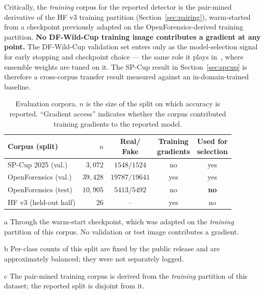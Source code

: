 \documentclass[10pt,journal]{IEEEtran}
\begin{document}
Critically, the \emph{training} corpus for the reported detector is the
pair-mined derivative of the HF v3 training partition
(Section~\ref{sec:pairing}), warm-started from a checkpoint previously adapted
on the OpenForensics-derived training partition. \textbf{No DF-Wild-Cup
training image contributes a gradient at any point.} The DF-Wild-Cup
validation set enters only as the model-selection signal for early stopping
and checkpoint choice --- the same role it plays
in~\cite{bhattacharjee2026caenet}, where ensemble weights are tuned on it.
The SP-Cup result in Section~\ref{sec:spcup} is therefore a cross-corpus
transfer result measured against an in-domain-trained baseline.

\begin{table}[!t]
\caption{Evaluation corpora. $n$ is the size of the split on which accuracy is
reported. ``Gradient access'' indicates whether the corpus contributed
training gradients to the reported model.}
\label{tab:data}
\centering
\footnotesize
\begin{threeparttable}
\begin{tabular}{@{}lrccc@{}}
\toprule
Corpus (split) & $n$ & \makecell{Real/\\Fake} & \makecell{Training\\gradients}
 & \makecell{Used for\\selection} \\
\midrule
SP-Cup 2025 (val.) & $3{,}072$ & $1548/1524$ & no & yes \\
OpenForensics (val.) & $39{,}428$ & $19787/19641$ & yes\tnote{a} & yes \\
OpenForensics (test) & $10{,}905$ & $5413/5492$ & no & \textbf{no} \\
HF v3 (held-out half) & $26$ & --\tnote{b} & yes\tnote{c} & no \\
\bottomrule
\end{tabular}
\begin{tablenotes}[flushleft]\footnotesize
\item[a] Through the warm-start checkpoint, which was adapted on the
\emph{training} partition of this corpus. No validation or test image
contributes a gradient.
\item[b] Per-class counts of this split are fixed by the public release and
are approximately balanced; they were not separately logged.
\item[c] The pair-mined training corpus is derived from the \emph{training}
partition of this dataset; the reported split is disjoint from it.
\end{tablenotes}
\end{threeparttable}
\end{table}
\end{document}
